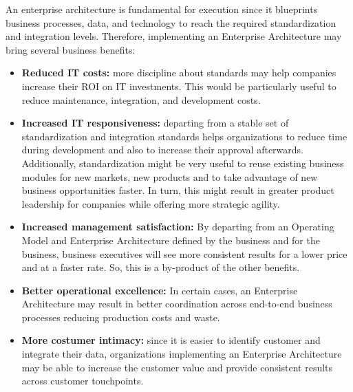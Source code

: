 %
%
An enterprise architecture is fundamental for execution since it blueprints business processes, data, and
technology to reach the required standardization and integration levels.
Therefore, implementing an Enterprise Architecture may bring several business benefits:

\begin{itemize}
    \item \textbf{Reduced IT costs:} more discipline about standards may help companies increase their
          ROI on IT investments.
          This would be particularly useful to reduce maintenance, integration, and development costs.
    \item \textbf{Increased IT responsiveness:} departing from a stable set of standardization and integration standards
          helps organizations to reduce time during development and also to increase their approval afterwards.
          Additionally, standardization might be very useful to reuse existing business modules for new markets,
          new products and to take advantage of new business opportunities faster.
          In turn, this might result in greater product leadership for companies while offering more strategic agility.
    \item \textbf{Increased management satisfaction:} By departing from an Operating Model and Enterprise Architecture
          defined by the business and for the business, business executives will see more consistent results
          for a lower price and at a faster rate.
          So, this is a by-product of the other benefits.
    \item \textbf{Better operational excellence:} In certain cases, an Enterprise Architecture may result in better
          coordination across end-to-end business processes reducing production costs and waste.
    \item \textbf{More costumer intimacy:} since it is easier to identify customer and integrate their data,
          organizations implementing an Enterprise Architecture may be able to increase the customer value
          and provide consistent results across customer touchpoints.
\end{itemize}

